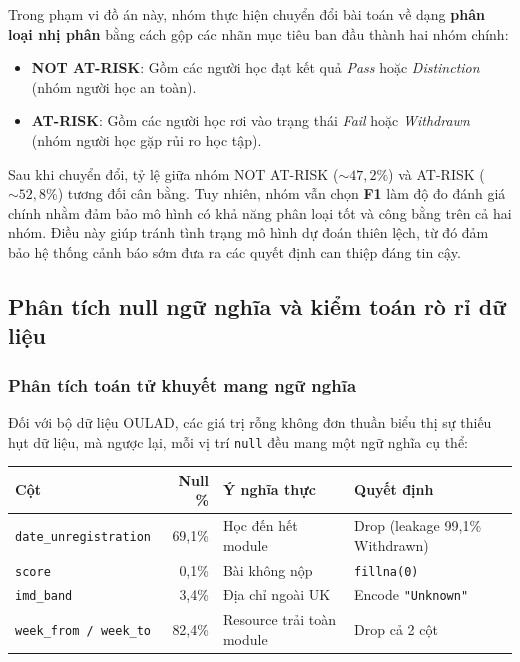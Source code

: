 Trong phạm vi đồ án này, nhóm thực hiện chuyển đổi bài toán về dạng \textbf{phân loại nhị phân} bằng cách gộp các nhãn mục tiêu ban đầu thành hai nhóm chính:
\begin{itemize}
    \item \textbf{NOT AT-RISK}: Gồm các người học đạt kết quả \textit{Pass} hoặc \textit{Distinction} (nhóm người học an toàn).
    \item \textbf{AT-RISK}: Gồm các người học rơi vào trạng thái \textit{Fail} hoặc \textit{Withdrawn} (nhóm người học gặp rủi ro học tập).
\end{itemize}

Sau khi chuyển đổi, tỷ lệ giữa nhóm NOT AT-RISK ($\sim 47,2\%$) và AT-RISK ($\sim 52,8\%$)
tương đối cân bằng. Tuy nhiên, nhóm vẫn chọn \textbf{F1} làm độ đo đánh
giá chính nhằm đảm bảo mô hình có khả năng phân loại tốt và công bằng trên cả
hai nhóm. Điều này giúp tránh tình trạng mô hình dự đoán thiên lệch, từ đó
đảm bảo hệ thống cảnh báo sớm đưa ra các quyết định can thiệp đáng tin cậy.

\subsection{Phân tích null ngữ nghĩa và kiểm toán rò rỉ dữ liệu}

\subsubsection{Phân tích toán tử khuyết mang ngữ nghĩa}

Đối với bộ dữ liệu OULAD, các 
  giá trị rỗng không đơn thuần biểu thị sự thiếu hụt dữ liệu,
  mà ngược lại, mỗi vị trí \texttt{null} đều mang một ngữ nghĩa cụ thể:

\begin{center}
\small
\renewcommand{\arraystretch}{1.3}
\begin{tabular}{|l|r|p{3.6cm}|p{3.4cm}|}
\hline
\textbf{Cột} & \textbf{Null \%} & \textbf{Ý nghĩa thực} & \textbf{Quyết định} \\
\hline
\texttt{date\_unregistration}   & 69,1\% & Học đến hết module         & Drop (leakage 99,1\% Withdrawn) \\
\texttt{score}                  & 0,1\%  & Bài không nộp              & \texttt{fillna(0)} \\
\texttt{imd\_band}              & 3,4\%  & Địa chỉ ngoài UK           & Encode \texttt{"Unknown"} \\
\texttt{week\_from / week\_to}  & 82,4\% & Resource trải toàn module  & Drop cả 2 cột \\
\hline
\end{tabular}
\end{center}


